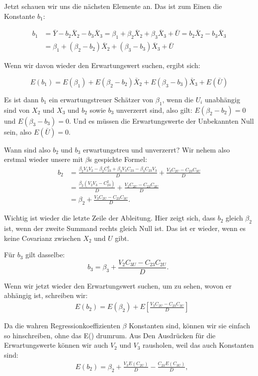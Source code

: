 \documentclass[
  10pt,
  letterpaper,
  a4paper, twoside]{scrreprt}
\begin{document}
\begin{tcolorbox}
Jetzt schauen wir uns die nächsten Elemente an. Das ist zum Einen die
Konstante \(b_1\):

\begin{align}
b_1 & =\bar{Y}-b_2 \bar{X}_2-b_3 \bar{X}_3=\beta_1+\beta_2 \bar{X}_2+\beta_3 \bar{X}_3+\bar{U}=b_2 \bar{X}_2-b_3 \bar{X}_3 \\
& =\beta_1+\left(\beta_2-b_2\right) \bar{X}_2+\left(\beta_3-b_3\right) \bar{X}_3+\bar{U}
\end{align}

Wenn wir davon wieder den Erwartungswert suchen, ergibt sich:

\[
E(b_1) = E(\beta_1) + E(\beta_2-b_2)\bar{X}_2 + E(\beta_3-b_3)\bar{X}_3 + E(\bar{U})
\]

Es ist dann \(b_1\) ein erwartungstreuer Schätzer von \(\beta_1\), wenn
die \(U_i\) unabhängig sind von \(X_2\) und \(X_3\) und \(b_2\) sowie
\(b_3\) unverzerrt sind, also gilt: \(E(\beta_2-b_2) = 0\) und
\(E(\beta_3-b_3) = 0\). Und es müssen die Erwartungswerte der
Unbekannten Null sein, also \(E(\bar{U})=0\).

Wann sind also \(b_2\) und \(b_3\) erwartungstreu und unverzerrt? Wir
nehem also erstmal wieder unsere mit \(\beta\)s gespickte Formel:
\begin{align}
b_2 & =\frac{\beta_2 V_3 V_2-\beta_2 C_{23}^2+\beta_3 V_3 C_{23}-\beta_3 C_{23} V_3}{D}+\frac{V_3 C_{2 U}-C_{23} C_{3 U}}{D} \\
& =\frac{\beta_2\left(V_2 V_3-C_{23}^2\right)}{D}+\frac{V_3 C_{2 U}-C_{23} C_{3 U}}{D}\\& =\beta_2+\frac{V_3 C_{2 U}-C_{23} C_{3 U}}{D} .
\end{align}

Wichtig ist wieder die letzte Zeile der Ableitung. Hier zeigt sich, dass
\(b_2\) gleich \(\beta_2\) ist, wenn der zweite Summand rechts gleich
Null ist. Das ist er wieder, wenn es keine Covarianz zwischen \(X_2\)
und \(U\) gibt.

Für \(b_3\) gilt dasselbe: \[
b_3=\beta_3+\frac{V_2 C_{3 U}-C_{23} C_{2 U}}{D} \text {. }
\]

Wenn wir jetzt wieder den Erwartungswert suchen, um zu sehen, wovon er
abhängig ist, schreiben wir: \begin{align}
& E\left(b_2\right)=E\left(\beta_2\right)+E\left[\frac{V_3 C_{2 U}-C_{23} C_{3 U}}{D}\right] 
\end{align}

Da die wahren Regressionkoeffizienten \(\beta\) Konstanten sind, können
wir sie einfach so hinschreiben, ohne das E() drumrum. Aus Den
Ausdrücken für die Erwartungswerte können wir auch \(V_2\) und \(V_3\)
rausholen, weil das auch Konstanten sind: \begin{align}
& E\left(b_2\right)=\beta_2+\frac{V_3 E\left(C_{2 U}\right)}{D}-\frac{C_{23} E\left(C_{3 U}\right)}{D},
\end{align}


\end{tcolorbox}
\end{document}
